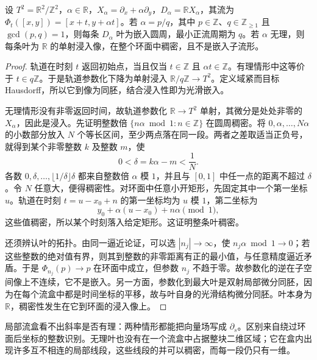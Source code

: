 \begin{proposition}
	\label{g1:prop:linear-torus-leaves}
	设 \(T^2=\mathbb R^2/\mathbb Z^2\)，\(\alpha\in\mathbb R\)，\(X_\alpha=\partial_x+\alpha\partial_y\)，\(D_\alpha=\mathbb R X_\alpha\)，其流为 \(\Phi_t([x,y])=[x+t,y+\alpha t]\)。若 \(\alpha=p/q\)，其中 \(p\in\mathbb Z\)、\(q\in\mathbb Z_{\geq1}\) 且 \(\gcd(p,q)=1\)，则每条 \(D_\alpha\) 叶为嵌入圆周，最小正流周期为 \(q\)。若 \(\alpha\) 无理，则每条叶为 \(\mathbb R\) 的单射浸入像，在整个环面中稠密，且不是嵌入子流形。
\end{proposition}
\begin{proof}
	轨道在时刻 \(t\) 返回初始点，当且仅当 \(t\in\mathbb Z\) 且 \(\alpha t\in\mathbb Z\)。有理情形中这等价于 \(t\in q\mathbb Z\)。于是轨道参数化下降为单射浸入 \(\mathbb R/q\mathbb Z\to T^2\)。定义域紧而目标 Hausdorff，所以它到像为同胚，结合浸入性即为光滑嵌入。

	无理情形没有非零返回时间，故轨道参数化 \(\mathbb R\to T^2\) 单射，其微分是处处非零的 \(X_\alpha\)，因此是浸入。先证明整数倍 \(\{n\alpha\bmod1:n\in\mathbb Z\}\) 在圆周稠密。将 \(0,\alpha,\ldots,N\alpha\) 的小数部分放入 \(N\) 个等长区间，至少两点落在同一段。两者之差取适当正负号，就得到某个非零整数 \(k\) 及整数 \(m\)，使
	\[
		0<\delta=k\alpha-m<\frac1N.
	\]
	各数 \(0,\delta,\ldots,\lfloor1/\delta\rfloor\delta\) 都来自整数倍 \(\alpha\) 模 \(1\)，并且与 \([0,1]\) 中任一点的距离不超过 \(\delta\)。令 \(N\) 任意大，便得稠密性。对环面中任意小开矩形，先固定其中一个第一坐标 \(u\)。轨道在时刻 \(t=u-x_0+n\) 的第一坐标均为 \(u\) 模 \(1\)，第二坐标为
	\[
		y_0+\alpha(u-x_0)+n\alpha\pmod1,
	\]
	这些值稠密，所以某个时刻落入给定矩形。这证明整条叶稠密。

	还须辨认叶的拓扑。由同一逼近论证，可以选 \(|n_j|\to\infty\)，使 \(n_j\alpha\bmod1\to0\)；若这些整数的绝对值有界，则其到整数的非零距离有正的最小值，与任意精度逼近矛盾。于是 \(\Phi_{n_j}(p)\to p\) 在环面中成立，但参数 \(n_j\) 不趋于零。故参数化的逆在子空间像上不连续，它不是嵌入。另一方面，参数化到最大叶是双射局部微分同胚，因为在每个流盒中都是时间坐标的平移，故与叶自身的光滑结构微分同胚。叶本身为 \(\mathbb R\)，稠密性发生在它到环面的浸入像上。
\end{proof}



局部流盒看不出斜率是否有理：两种情形都能把向量场写成 \(\partial_s\)。区别来自绕过环面后坐标的整数识别。无理叶也没有在一个流盒中占据整块二维区域；它在盒内出现许多互不相连的局部线段，这些线段的并可以稠密，而每一段仍只有一维。

